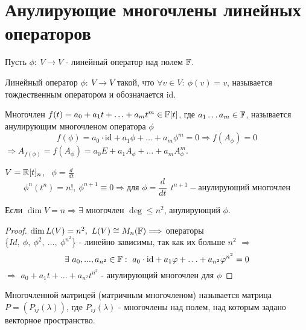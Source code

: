 \section{Анулирующие многочлены линейных операторов}
    Пусть $\phi: \ V\to V$ - линейный оператор над полем $\mathbb{F}$.
    \begin{definition}
        Линейный оператор $\phi: \ V\to V$ такой, что $\forall v\in V: \ \phi(v) = v$, называется тождественным оператором и обозначается id.
    \end{definition}
    \begin{definition}
        Многочлен $f(t) = a_0+a_1t+\ldots+a_mt^m\in\mathbb{F}[t]$, где $a_1\ldots a_m\in\mathbb{F}$, называется анулирующим многочленом оператора $\phi$ 
        $$f(\phi) = a_0\cdot\text{id}+a_1\phi+\ldots+a_m\phi^m = 0 \Longrightarrow f(A_{\phi}) = 0$$
        $\Longrightarrow A_{f(\phi)} = f(A_{\phi}) = a_0E+a_1A_{\phi}+\ldots+a_mA_{\phi}^m$.
    \end{definition}
    \begin{example1}
        $V = \mathbb{R}[t]_n$, \ $\phi = \frac{d}{dt}$
        $$\phi^n(t^n) = n!, \ \phi^{n+1}\equiv0 \Longrightarrow \text{для } \phi = \frac{d}{dt} \ \ t^{n+1} - \text{анулирующий многочлен}$$
    \end{example1}
    \begin{subtheorem}
        Если $\dim V = n \Longrightarrow \exists$ многочлен $\deg \leq n^2$, анулирующий $\phi$.
    \end{subtheorem}
    \begin{proof}
        $\dim L(V) = n^2, \ L(V) \cong M_n(\mathbb{F}) \Longrightarrow$ операторы \\ \{$Id, \ \phi, \ \phi^2, \ \ldots, \ \phi^{n^2}$\} - линейно зависимы, так как их больше $n^2$ $\Longrightarrow$
        $$\exists \ a_0,...,a_{n^2} \in \mathbb{F}: \ a_0 \cdot \text{id}+a_1\varphi+\ldots+a_{n^2}\varphi^{n^2} = 0$$ 
        $\Longrightarrow$ $a_0+a_1t+\ldots+a_{n^2}t^{n^2}$ - анулирующий многочлен для $\phi$
    \end{proof}
    \begin{definition}
        Многочленной матрицей (матричным многочленом) называется матрица $P = (P_{ij}(\lambda))$, где $P_{ij}(\lambda)$ - многочлены над полем, над которым задано векторное пространство.
    \end{definition}
